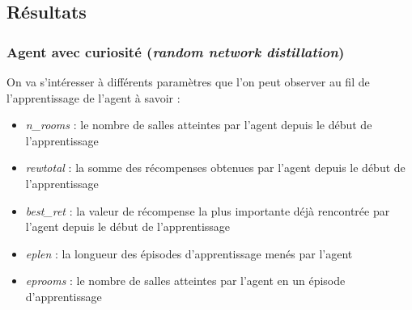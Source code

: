 \documentclass[a4paper,12pt]{report}
\begin{document}
\subsection{Résultats}
\subsubsection{Agent avec curiosité (\textit{random network distillation})}
On va s'intéresser à différents paramètres que l'on peut observer au fil de l'apprentissage de l'agent à savoir :
\begin{itemize}
    \item \textit{n\_rooms} : le nombre de salles atteintes par l'agent depuis le début de l'apprentissage
    \item \textit{rewtotal} : la somme des récompenses obtenues par l'agent depuis le début de l'apprentissage
    \item \textit{best\_ret} : la valeur de récompense la plus importante déjà rencontrée par l'agent depuis le début de l'apprentissage
    \item \textit{eplen} : la longueur des épisodes d'apprentissage menés par l'agent
    \item \textit{eprooms} : le nombre de salles atteintes par l'agent en un épisode d'apprentissage
\end{itemize}
\end{document}
